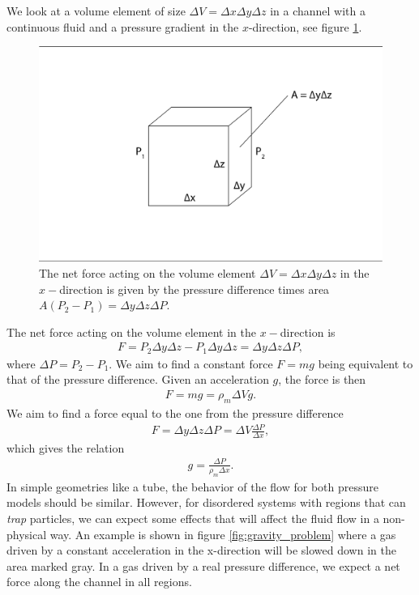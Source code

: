 We look at a volume element of size $\Delta V = \Delta x\Delta y\Delta z$ in a channel with a continuous fluid and a pressure gradient in the $x$-direction, see figure \ref{fig:pressure_gravity_equivalent}. 
\begin{figure}[h]
\begin{center}
\includegraphics[width=\textwidth, trim=0cm 0cm 0cm 0cm, clip]{DSMC/figures/pressure_to_gravity.eps}
\end{center}
\caption{The net force acting on the volume element $\Delta V = \Delta x\Delta y\Delta z$ in the $x-$direction is given by the pressure difference times area $A(P_2 - P_1) = \Delta y\Delta z\Delta P$.}
\label{fig:pressure_gravity_equivalent}
\end{figure}
The net force acting on the volume element in the $x-$direction is
\begin{align}
	F = P_2\Delta y\Delta z - P_1\Delta y\Delta z = \Delta y\Delta z\Delta P,
\end{align}
where $\Delta P = P_2 - P_1$. We aim to find a constant force $F=mg$ being equivalent to that of the pressure difference. Given an acceleration $g$, the force is then
\begin{align}
	F = mg = \rho_m \Delta V g.
\end{align}
We aim to find a force equal to the one from the pressure difference
\begin{align}
	F = \Delta y\Delta z\Delta P = \Delta V \frac{\Delta P}{\Delta x},	
\end{align}
which gives the relation
\begin{align}
	\label{eq:acceleration_to_pressure_difference}
	g = \frac{\Delta P}{\rho_m\Delta x}.
\end{align}
In simple geometries like a tube, the behavior of the flow for both pressure models should be similar. However, for disordered systems with regions that can \textit{trap} particles, we can expect some effects that will affect the fluid flow in a non-physical way. An example is shown in figure \ref{fig:gravity_problem} where a gas driven by a constant acceleration in the x-direction will be slowed down in the area marked gray. In a gas driven by a real pressure difference, we expect a net force along the channel in all regions.
